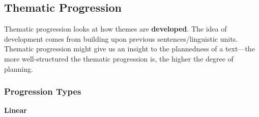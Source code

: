 \documentclass[../main.tex]{subfiles}
\begin{document}
    \subsection{Thematic Progression}
    Thematic progression looks at how themes are \textbf{developed}. The idea of development comes from building upon previous sentences/linguistic units. Thematic progression might give us an insight to the plannedness of a text---the more well-structured the thematic progression is, the higher the degree of planning.

        \subsubsection{Progression Types}
        \textbf{Linear}
\end{document}
